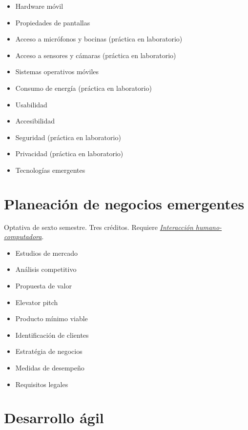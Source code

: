 \documentclass{article}
\begin{document}
\begin{multicols}{4}
\begin{itemize}
\item{Hardware m\'{o}vil}
\item{Propiedades de pantallas}  
\item{Acceso a micr\'{o}fonos y bocinas (pr\'{a}ctica en laboratorio)}  
\item{Acceso a sensores y c\'{a}maras (pr\'{a}ctica en laboratorio)}      
\item{Sistemas operativos m\'{o}viles}
\item{Consumo de energ\'{i}a (pr\'{a}ctica en laboratorio)}  
\item{Usabilidad}
\item{Accesibilidad}
\item{Seguridad (pr\'{a}ctica en laboratorio)}  
\item{Privacidad (pr\'{a}ctica en laboratorio)}  
\item{Tecnolog\'{i}as emergentes}
\end{itemize}

\newpage

\hypertarget{pdne}{\section*{Planeaci\'{o}n de negocios emergentes}}

Optativa de sexto semestre. Tres cr\'{e}ditos. Requiere
\hyperlink{ihc}{\em Interacci\'{o}n humano-computadora}.

\begin{itemize}
\item{Estudios de mercado}
\item{An\'{a}lisis competitivo}
\item{Propuesta de valor}
\item{Elevator pitch}
\item{Producto m\'{i}nimo viable}
\item{Identificaci\'{o}n de clientes}
\item{Estrat\'{e}gia de negocios}
\item{Medidas de desempe\~{n}o}
\item{Requisitos legales}
\end{itemize}

\vfill\null \columnbreak

\hypertarget{da}{\section*{Desarrollo \'{a}gil}} 


\end{multicols}
\end{document}
